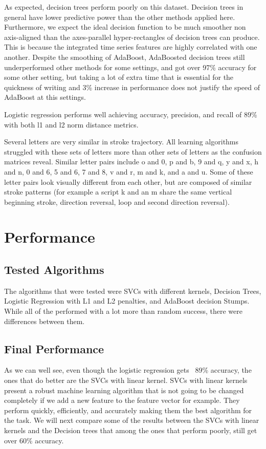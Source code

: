 \documentclass{article}
\begin{document}
As expected, decision trees perform poorly on this dataset.  Decision trees in general have lower predictive power than the other methods applied here.  Furthermore, we expect the ideal decision function to be much smoother non axis-aligned than the axes-parallel hyper-rectangles of decision trees can produce.  This is because the integrated time series features are highly correlated with one another.  Despite the smoothing of AdaBoost, AdaBoosted decision trees still underperformed other methods for some settings, and got over 97\% accuracy for some other setting, but taking a lot of extra time that is essential for the quickness of writing and 3\% increase in performance does not justify the speed of AdaBoost at this settings.

Logistic regression performs well achieving accuracy, precision, and recall of 89\% with both l1 and l2 norm distance metrics.  
 
Several letters are very similar in stroke trajectory.  All learning algorithms struggled with these sets of letters more than other sets of letters as the confusion matrices reveal.  Similar letter pairs include o and 0, p and b, 9 and q, y and x, h and n, 0 and 6, 5 and 6, 7 and 8, v and r, m and k, and a and u.  Some of these letter pairs look visually different from each other, but are composed of similar stroke patterns (for example a script k and an m share the same vertical beginning stroke, direction reversal, loop and second direction reversal).


\section{Performance}
\subsection{Tested Algorithms}
The algorithms that were tested were SVCs with different kernels, Decision Trees, Logistic Regression with L1 and L2 penalties, and AdaBoost decision Stumps. While all of the performed with a lot more than random success, there were differences between them.

\subsection{Final Performance}

 As we can well see, even though the logistic regression gets ~89\% accuracy, the ones that do better are the SVCs with linear kernel. SVCs with linear kernels present a robust machine learning algorithm that is not going to be changed completely if we add a new feature to the feature vector for example. They perform quickly, efficiently, and accurately making them the best algorithm for the task. We will next compare some of the results between the SVCs with linear kernels and the Decision trees that among the ones that perform poorly, still get over 60\% accuracy.
\end{document}
